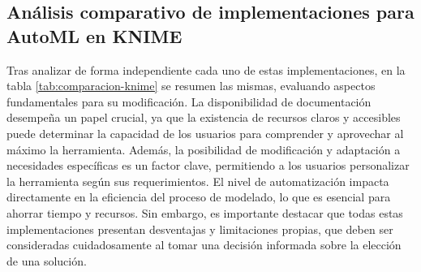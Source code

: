 \subsection{Análisis comparativo de implementaciones para AutoML en KNIME}
Tras analizar de forma independiente cada uno de estas implementaciones, en la tabla \ref{tab:comparacion-knime} se resumen las mismas, evaluando aspectos fundamentales para su modificación.  La disponibilidad de documentación desempeña un papel crucial, ya que la existencia de recursos claros y accesibles puede determinar la capacidad de los usuarios para comprender y aprovechar al máximo la herramienta. Además, la posibilidad de modificación y adaptación a necesidades específicas es un factor clave, permitiendo a los usuarios personalizar la herramienta según sus requerimientos. El nivel de automatización impacta directamente en la eficiencia del proceso de modelado, lo que es esencial para ahorrar tiempo y recursos. Sin embargo, es importante destacar que todas estas implementaciones presentan desventajas y limitaciones propias, que deben ser consideradas cuidadosamente al tomar una decisión informada sobre la elección de una solución.

